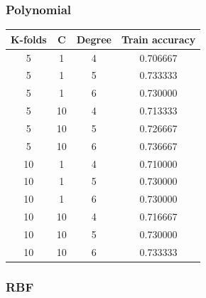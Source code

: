 \documentclass{article}
\begin{document}
\subsubsection{Polynomial}

\begin{table}[h]
\begin{tabular}{|c|c|c|c|}
\hline
\textbf{K-folds} & \textbf{C}  & \textbf{Degree} & \textbf{Train accuracy}    \\ \hline
5       & 1  & 4      & 0.706667 \\ \hline
5       & 1  & 5      & 0.733333 \\ \hline
5       & 1  & 6      & 0.730000 \\ \hline
5       & 10 & 4      & 0.713333 \\ \hline
5       & 10 & 5      & 0.726667 \\ \hline
\rowcolor[HTML]{34FF34}
5       & 10 & 6      & 0.736667 \\ \hline
10      & 1  & 4      & 0.710000 \\ \hline
10      & 1  & 5      & 0.730000 \\ \hline
10      & 1  & 6      & 0.730000 \\ \hline
10      & 10 & 4      & 0.716667 \\ \hline
10      & 10 & 5      & 0.730000 \\ \hline
10      & 10 & 6      & 0.733333 \\ \hline
\end{tabular}
\end{table}

\pagebreak

\subsubsection{RBF}
\end{document}
